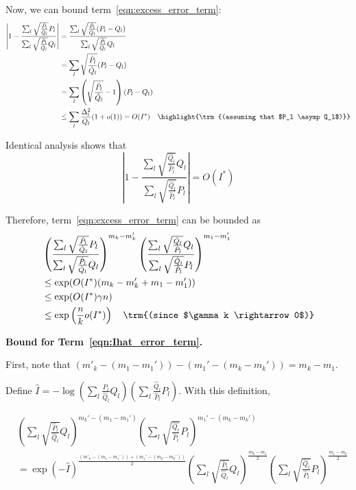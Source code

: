 \documentclass{article}
\begin{document}
Now, we can bound term~\ref{eqn:excess_error_term}:
\begin{align*}
\left| 1 -  \frac{\sum_l \sqrt{\frac{\hat{P}_l}{\hat{Q}_l} } P_l}
                {\sum_l \sqrt{\frac{\hat{P}_l}{\hat{Q}_l} } Q_l}  \right|
 &= \frac{ \sum_l \sqrt{ \frac{\hat{P}_l}{\hat{Q}_l}} (P_l - Q_l) }
     { \sum_l \sqrt{ \frac{\hat{P}_l}{\hat{Q}_l}} Q_l } \\
&= \sum_l \sqrt{ \frac{\hat{P}_l}{\hat{Q}_l} }(P_l - Q_l) \\
&= \sum_{l} \left( \sqrt{ \frac{\hat{P}_l}{\hat{Q}_l} } - 1 \right) (P_l - Q_l)  \\
&\leq \sum_l \frac{\Delta^2_l}{Q_l}(1+o(1)) = O( I^* ) \quad 
   \highlight{\trm{(assuming that $P_l \asymp Q_l$)}}
\end{align*}

Identical analysis shows that
\[
\left| 1 - \frac{ \sum_l \sqrt{\frac{\hat{Q}_l}{\hat{P}_l} } Q_l}
             { \sum_l \sqrt{\frac{\hat{Q}_l}{\hat{P}_l} } P_l} \right| 
= O(I^*) 
\]

Therefore, term~\ref{eqn:excess_error_term} can be bounded as
\begin{align*}
&  \left( \frac{\sum_l \sqrt{\frac{\hat{P}_l}{\hat{Q}_l} } P_l}
                {\sum_l \sqrt{\frac{\hat{P}_l}{\hat{Q}_l} } Q_l}  \right)^{m_k - m_k'}
 \left( \frac{ \sum_l \sqrt{\frac{\hat{Q}_l}{\hat{P}_l} } Q_l}
             { \sum_l \sqrt{\frac{\hat{Q}_l}{\hat{P}_l} } P_l} \right)^{m_1 - m_1'}  \\
&\leq \exp( O(I^*) (m_k - m_k' + m_1 - m_1') ) \\
&\leq \exp( O(I^*) \gamma n) \\
&\leq \exp\left( \frac{n}{k} o(I^*) \right) \quad \trm{(since $\gamma k \rightarrow 0$)}
\end{align*}

\textbf{Bound for Term~\ref{eqn:Ihat_error_term}.}

First, note that $ (m'_k - (m_1 - m_1')) - (m_1' - (m_k - m_k')) = m_k - m_1$.

Define 
$\hat{I} = - \log \left( \sum_l \frac{\hat{P}_l}{\hat{Q}_l} Q_l \right) \left( \sum_l \frac{\hat{Q}_l}{\hat{P}_l} P_l \right) $. 
With this definition, 

\begin{align*}
& \left( \sum_l \sqrt{\frac{\hat{P}_l}{\hat{Q}_l} } Q_l \right)^{m_k' - (m_1 - m_1')} 
       \left( \sum_l \sqrt{\frac{\hat{Q_l}}{\hat{P}_l} } P_l \right)^{m_1' - (m_k - m_k')} \\
&= \exp( - \hat{I} )^{\frac{(m'_k - (m_1 - m_1')) + (m_1' - (m_k - m_k'))}{2}}  \left( \sum_l \sqrt{\frac{\hat{P}_l}{\hat{Q}_l}} Q_l \right)^{\frac{m_k - m_1}{2}} 
 \left( \sum_l \sqrt{\frac{\hat{Q}_l}{\hat{P}_l}} P_l \right)^{\frac{m_1 - m_k}{2}} 
\end{align*}
\end{document}
